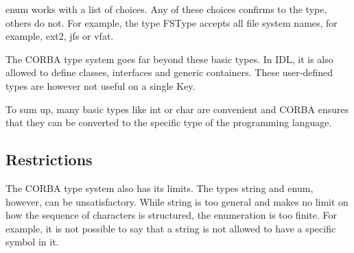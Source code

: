 {\ttfamily enum} works with a list of choices. Any of these choices confirms to the type, others do not. For example, the type F\+S\+Type accepts all file system names, for example, ext2, jfs or vfat.

The {\ttfamily C\+O\+R\+B\+A} type system goes far beyond these basic types. In I\+D\+L, it is also allowed to define classes, interfaces and generic containers. These user-\/defined types are however not useful on a single Key.

To sum up, many basic types like int or char are convenient and C\+O\+R\+B\+A ensures that they can be converted to the specific type of the programming language.

\subsection*{Restrictions}

The {\ttfamily C\+O\+R\+B\+A} type system also has its limits. The types {\ttfamily string} and {\ttfamily enum}, however, can be unsatisfactory. While string is too general and makes no limit on how the sequence of characters is structured, the enumeration is too finite. For example, it is not possible to say that a string is not allowed to have a specific symbol in it. 